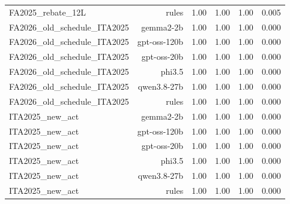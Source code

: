\begin{table}[t]
\begin{tabular}{lrrrrr}
FA2025\_rebate\_12L & rules & 1.00 & 1.00 & 1.00 & 0.005 \\
FA2026\_old\_schedule\_ITA2025 & gemma2-2b & 1.00 & 1.00 & 1.00 & 0.000 \\
FA2026\_old\_schedule\_ITA2025 & gpt-oss-120b & 1.00 & 1.00 & 1.00 & 0.000 \\
FA2026\_old\_schedule\_ITA2025 & gpt-oss-20b & 1.00 & 1.00 & 1.00 & 0.000 \\
FA2026\_old\_schedule\_ITA2025 & phi3.5 & 1.00 & 1.00 & 1.00 & 0.000 \\
FA2026\_old\_schedule\_ITA2025 & qwen3.8-27b & 1.00 & 1.00 & 1.00 & 0.000 \\
FA2026\_old\_schedule\_ITA2025 & rules & 1.00 & 1.00 & 1.00 & 0.000 \\
ITA2025\_new\_act & gemma2-2b & 1.00 & 1.00 & 1.00 & 0.000 \\
ITA2025\_new\_act & gpt-oss-120b & 1.00 & 1.00 & 1.00 & 0.000 \\
ITA2025\_new\_act & gpt-oss-20b & 1.00 & 1.00 & 1.00 & 0.000 \\
ITA2025\_new\_act & phi3.5 & 1.00 & 1.00 & 1.00 & 0.000 \\
ITA2025\_new\_act & qwen3.8-27b & 1.00 & 1.00 & 1.00 & 0.000 \\
ITA2025\_new\_act & rules & 1.00 & 1.00 & 1.00 & 0.000 \\
\bottomrule
\end{tabular}
\end{table}
